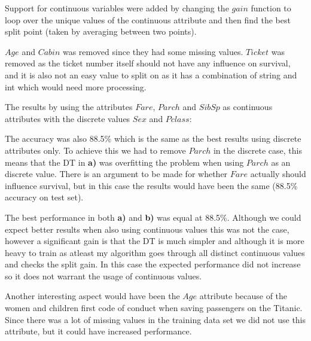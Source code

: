 \documentclass[11pt, english]{../Template/NTNUoving}
\begin{document}
\begin{oppgave}
\begin{punkt}
    \end{punkt}

    \begin{punkt}
        Support for continuous variables were added by changing the $gain$ function to
        loop over the unique values of the continuous attribute and then find the best split point (taken by averaging between two points).

        $Age$ and $Cabin$ was removed since they had some missing values. $Ticket$ was removed as the ticket number itself should not have
        any influence on survival, and it is also not an easy value to split on as it has a combination of string and int which would need more processing.

        The results by using the attributes $Fare$, $Parch$ and $SibSp$ as continuous attributes with the discrete values $Sex$ and $Pclass$:
        

        The accuracy was also 88.5\% which is the same as the best results using discrete attributes only. To achieve this we had to remove $Parch$ in the discrete case,
        this means that the DT in \textbf{a)} was overfitting the problem when using $Parch$ as an discrete value.
        There is an argument to be made for whether $Fare$ actually should influence survival, but in this case the results would have been the same (88.5\% accuracy on test set).
    \end{punkt}

    \begin{punkt}
        The best performance in both \textbf{a)} and \textbf{b)} was equal at 88.5\%. Although we could expect better results when also using
        continuous values this was not the case, however a significant gain is that the DT is much simpler and although it is more heavy to train as atleast my algorithm goes
        through all distinct continuous values and checks the split gain. In this case the expected performance did not increase so it does not warrant the usage of continuous values.

        Another interesting aspect would have been the $Age$ attribute because of the women and children first
        code of conduct when saving passengers on the Titanic\cite{women}. Since there was a lot of missing values in the training data set we did not use this attribute, but it could have increased performance.


\end{punkt}
\end{oppgave}
\end{document}
